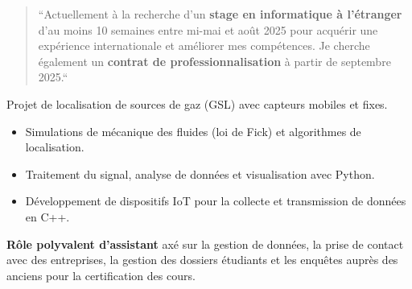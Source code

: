 \documentclass[10pt,a4paper,ragged2e,withhyper]{../AltaCV/altacv}
\begin{document}



\makecvheader


\begin{paracol}{2}

  \begin{quote}
    ``Actuellement à la recherche d'un \textbf{stage en informatique à l'étranger} d'au moins 10 semaines entre mi-mai et août 2025 pour acquérir une expérience internationale et améliorer mes compétences.
    Je cherche également un \textbf{contrat de professionnalisation} à partir de septembre 2025.``
  \end{quote}



  Projet de localisation de sources de gaz (GSL) avec capteurs mobiles et fixes.
  
  \begin{itemize}
    \item Simulations de mécanique des fluides (loi de Fick) et algorithmes de localisation.
    \item Traitement du signal, analyse de données et visualisation avec Python.
    \item Développement de dispositifs IoT pour la collecte et transmission de données en C++.
  \end{itemize}
  \divider


  \textbf{Rôle polyvalent d'assistant} axé sur la gestion de données, la prise de contact avec des entreprises, la gestion des dossiers étudiants et les enquêtes auprès des anciens pour la certification des cours.

  \divider



\end{paracol}
\end{document}
